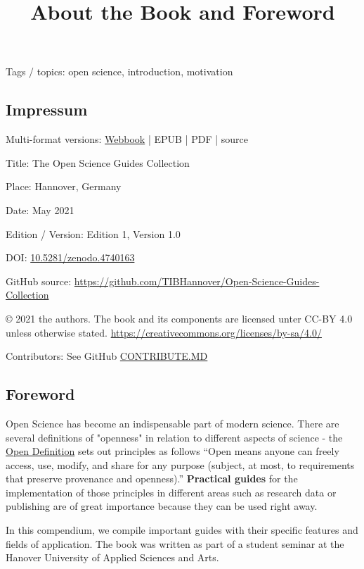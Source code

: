 \documentclass{article}
\begin{document}
\title{About the Book and Foreword}

\maketitle


Tags / topics: open science, introduction, motivation


\subsection{Impressum}\label{H8810070}



Multi-format versions: \href{https://vivliostyle.vercel.app/#src=https://tibhannover.github.io/Open-Science-Guides-Collection/html/index.html&bookMode=true}{Webbook} | EPUB | PDF | source


Title: The Open Science Guides Collection


Place: Hannover, Germany


Date: May 2021


Edition / Version: Edition 1, Version 1.0


DOI: \href{https://doi.org/10.5281/zenodo.4740163}{10.5281/zenodo.4740163}


GitHub source: \href{https://github.com/TIBHannover/Open-Science-Guides-Collection}{https://github.com/TIBHannover/Open-Science-Guides-Collection} 


© 2021 the authors. The book and its components are licensed unter CC-BY 4.0 unless otherwise stated. \href{https://creativecommons.org/licenses/by-sa/4.0/}{https://creativecommons.org/licenses/by-sa/4.0/} 


Contributors: See GitHub \href{https://github.com/TIBHannover/Open-Science-Guides-Collection/blob/main/CONTRIBUTE.MD}{CONTRIBUTE.MD} 


\subsection{Foreword}\label{H592737}



Open Science has become an indispensable part of modern science. There are several definitions of "openness" in relation to different aspects of science - the \href{https://opendefinition.org/}{Open Definition} sets out principles as follows “Open means anyone can freely access, use, modify, and share for any purpose (subject, at most, to requirements that preserve provenance and openness).” \textbf{Practical guides} for the implementation of those principles in different areas such as research data or publishing are of great importance because they can be used right away. 


In this compendium, we compile important guides with their specific features and fields of application. The book was written as part of a student seminar at the Hanover University of Applied Sciences and Arts.
\end{document}
